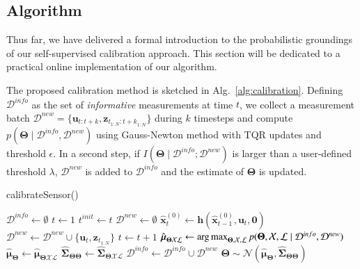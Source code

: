 \subsection{Algorithm}

Thus far, we have delivered a formal introduction to the probabilistic
groundings of our self-supervised calibration approach. This section will be
dedicated to a practical online implementation of our algorithm.

The proposed calibration method is sketched in Alg.~\ref{alg:calibration}.
Defining $\mathcal{D}^{info}$ as the set of \emph{informative} measurements at
time $t$, we collect a measurement batch
$\mathcal{D}^{new}=\{\mathbf{u}_{t:t+k}, \mathbf{z}_{t_{1:N}:{t+k}_{1:N}}\}$
during $k$ timesteps and compute
$p(\mathbf{\Theta}\mid\mathcal{D}^{info},\mathcal{D}^{new})$ using Gauss-Newton
method with TQR updates and threshold $\epsilon$. In a second step, if
$I(\mathbf{\Theta}\mid\mathcal{D}^{info};\mathcal{D}^{new})$ is larger
than a user-defined threshold $\lambda$, $\mathcal{D}^{new}$ is added to
$\mathcal{D}^{info}$ and the estimate of $\mathbf{\Theta}$ is updated.

\begin{algorithm}[ht]
\caption{calibrateSensor()}
\label{alg:calibration}
{}
\vskip 0.2cm
$\mathcal{D}^{info}\leftarrow\emptyset$ \;
$t\leftarrow1$ \;
 {
   \;
  $t^{init} \leftarrow t$ \;
  $\mathcal{D}^{new}\leftarrow\emptyset$ \;
   {
    $\hat{\mathbf{x}}_t^{(0)} \leftarrow
      \mathbf{h}(\hat{\mathbf{x}}_{t-1}^{(0)},\mathbf{u}_t,\mathbf{0})$ \;
    $\mathcal{D}^{new}\leftarrow\mathcal{D}^{new}\cup\{\mathbf{u}_t,
      \mathbf{z}_{t_{1:N}}\}$ \;
    $t \leftarrow t + 1$ \;
  }
   \;
  $\hat{\boldsymbol{\mu}}_{\boldsymbol{\Theta}\mathcal{X}\mathcal{L}} \leftarrow
    \operatorname*{arg\,max}_{\boldsymbol{\Theta},\mathcal{X},\mathcal{L}}
    p(\boldsymbol{\Theta}, \mathcal{X},\mathcal{L} \mid\mathcal{D}^{info},
    \mathcal{D}^{new})$ \;
   \;
  $\hat{\boldsymbol{\mu}}_{\boldsymbol{\Theta}}\leftarrow
    \hat{\boldsymbol{\mu}}_{\boldsymbol{\Theta}\mathcal{X}\mathcal{L}}$ \;
  $\hat{\boldsymbol{\Sigma}}_{\boldsymbol{\Theta}\boldsymbol{\Theta}}\leftarrow
    \hat{\boldsymbol{\Sigma}}_{\boldsymbol{\Theta}\mathcal{X}\mathcal{L}}$ \;
   \;
   {
    $\mathcal{D}^{info}\leftarrow\mathcal{D}^{info}\cup\mathcal{D}^{new}$ \;
    $\boldsymbol{\Theta}\sim\mathcal{N}(
      \hat{\boldsymbol{\mu}}_{\boldsymbol{\Theta}},
      \hat{\boldsymbol{\Sigma}}_{\boldsymbol{\Theta}\boldsymbol{\Theta}})$ \;
  }
}
\end{algorithm}

